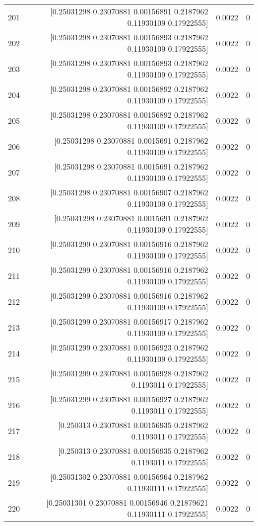 \begin{longtable}{lrrr}
201 & [0.25031298 0.23070881 0.00156891 0.2187962  0.11930109 0.17922555] & 0.0022 & 0 \\
202 & [0.25031298 0.23070881 0.00156893 0.2187962  0.11930109 0.17922555] & 0.0022 & 0 \\
203 & [0.25031298 0.23070881 0.00156893 0.2187962  0.11930109 0.17922555] & 0.0022 & 0 \\
204 & [0.25031298 0.23070881 0.00156892 0.2187962  0.11930109 0.17922555] & 0.0022 & 0 \\
205 & [0.25031298 0.23070881 0.00156892 0.2187962  0.11930109 0.17922555] & 0.0022 & 0 \\
206 & [0.25031298 0.23070881 0.0015691  0.2187962  0.11930109 0.17922555] & 0.0022 & 0 \\
207 & [0.25031298 0.23070881 0.0015691  0.2187962  0.11930109 0.17922555] & 0.0022 & 0 \\
208 & [0.25031298 0.23070881 0.00156907 0.2187962  0.11930109 0.17922555] & 0.0022 & 0 \\
209 & [0.25031298 0.23070881 0.0015691  0.2187962  0.11930109 0.17922555] & 0.0022 & 0 \\
210 & [0.25031299 0.23070881 0.00156916 0.2187962  0.11930109 0.17922555] & 0.0022 & 0 \\
211 & [0.25031299 0.23070881 0.00156916 0.2187962  0.11930109 0.17922555] & 0.0022 & 0 \\
212 & [0.25031299 0.23070881 0.00156916 0.2187962  0.11930109 0.17922555] & 0.0022 & 0 \\
213 & [0.25031299 0.23070881 0.00156917 0.2187962  0.11930109 0.17922555] & 0.0022 & 0 \\
214 & [0.25031299 0.23070881 0.00156923 0.2187962  0.11930109 0.17922555] & 0.0022 & 0 \\
215 & [0.25031299 0.23070881 0.00156928 0.2187962  0.1193011  0.17922555] & 0.0022 & 0 \\
216 & [0.25031299 0.23070881 0.00156927 0.2187962  0.1193011  0.17922555] & 0.0022 & 0 \\
217 & [0.250313   0.23070881 0.00156935 0.2187962  0.1193011  0.17922555] & 0.0022 & 0 \\
218 & [0.250313   0.23070881 0.00156935 0.2187962  0.1193011  0.17922555] & 0.0022 & 0 \\
219 & [0.25031302 0.23070881 0.00156964 0.2187962  0.11930111 0.17922555] & 0.0022 & 0 \\
220 & [0.25031301 0.23070881 0.00156946 0.21879621 0.11930111 0.17922555] & 0.0022 & 0 \\

\end{longtable}
